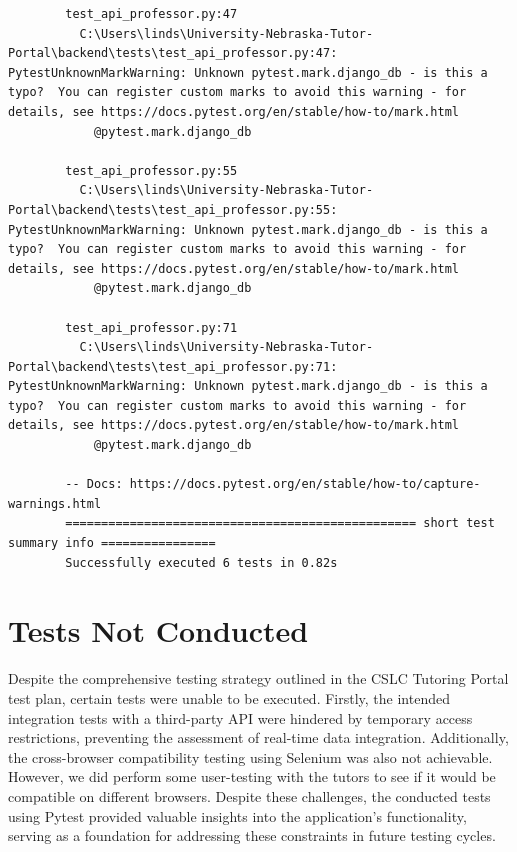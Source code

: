 \documentclass[oneside,openany,obeyspaces]{book}
\newcommand\tab[1][1cm]{\hspace*{#1}}
\begin{document}
\begin{flushleft}
\begin{verbatim}
        test_api_professor.py:47
          C:\Users\linds\University-Nebraska-Tutor-Portal\backend\tests\test_api_professor.py:47: PytestUnknownMarkWarning: Unknown pytest.mark.django_db - is this a typo?  You can register custom marks to avoid this warning - for details, see https://docs.pytest.org/en/stable/how-to/mark.html
            @pytest.mark.django_db
        
        test_api_professor.py:55
          C:\Users\linds\University-Nebraska-Tutor-Portal\backend\tests\test_api_professor.py:55: PytestUnknownMarkWarning: Unknown pytest.mark.django_db - is this a typo?  You can register custom marks to avoid this warning - for details, see https://docs.pytest.org/en/stable/how-to/mark.html
            @pytest.mark.django_db
        
        test_api_professor.py:71
          C:\Users\linds\University-Nebraska-Tutor-Portal\backend\tests\test_api_professor.py:71: PytestUnknownMarkWarning: Unknown pytest.mark.django_db - is this a typo?  You can register custom marks to avoid this warning - for details, see https://docs.pytest.org/en/stable/how-to/mark.html
            @pytest.mark.django_db
        
        -- Docs: https://docs.pytest.org/en/stable/how-to/capture-warnings.html
        ================================================= short test summary info ================ 
        Successfully executed 6 tests in 0.82s
    \end{verbatim}


    \section{Tests Not Conducted}

    \tab Despite the comprehensive testing strategy outlined in the CSLC Tutoring Portal test plan, certain tests were unable to be executed. Firstly, the intended integration tests with a third-party API were hindered by temporary access restrictions, preventing the assessment of real-time data integration. Additionally, the cross-browser compatibility testing using Selenium was also not achievable. However, we did perform some user-testing with the tutors to see if it would be compatible on different browsers. Despite these challenges, the conducted tests using Pytest provided valuable insights into the application's functionality, serving as a foundation for addressing these constraints in future testing cycles.\\~\\






\end{flushleft}
\end{document}

